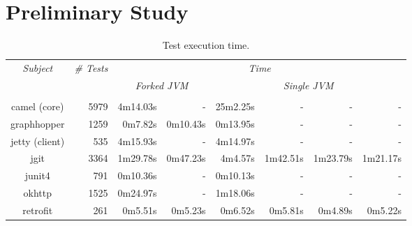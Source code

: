 \section{Preliminary Study}

\begin{table*}[t]
  \centering
  \begin{tabular}{|c|r|r|r|r|r|r|r|}
    \hline
    \multirow{2}{*}{\emph{Subject}} & \multirow{2}{*}{\emph{\# Tests}} &  \multicolumn{6}{c|}{\emph{Time}}\\
    \cline{3-8}
    & & \multicolumn{2}{c|}{\emph{Forked JVM}} & \multicolumn{4}{c|}{\emph{Single JVM}}   \\
    \cline{3-8}
    & & \multicolumn{1}{c|}{\Seq{}} & \multicolumn{1}{c|}{\ParClassSeqMeth{}} & \multicolumn{1}{c|}{\Seq{}} & \multicolumn{1}{c|}{\ParClassSeqMeth{}} & \multicolumn{1}{c|}{\SeqClassParMeth{}} & \multicolumn{1}{c|}{\ParClassParMeth{}}\\     \hline
    camel (core) & 5979 & 4m14.03s & - & 25m2.25s & - & - & - \\
    \hline
    graphhopper & 1259 & 0m7.82s & 0m10.43s & 0m13.95s & - & - & - \\
    \hline
    jetty (client) & 535 & 4m15.93s & - & 4m14.97s & - & - & - \\
    \hline
    jgit & 3364 & 1m29.78s & 0m47.23s & 4m4.57s & 1m42.51s & 1m23.79s & 1m21.17s \\
    \hline
    junit4 & 791 & 0m10.36s & - & 0m10.13s & - & - & - \\
    \hline
    okhttp & 1525 & 0m24.97s & - & 1m18.06s & - & - & - \\
    \hline
    retrofit & 261 & 0m5.51s & 0m5.23s & 0m6.52s & 0m5.81s & 0m4.89s & 0m5.22s \\
    \hline
  \end{tabular}
  \caption{\label{table:cost}Test execution time.}
\end{table*}


